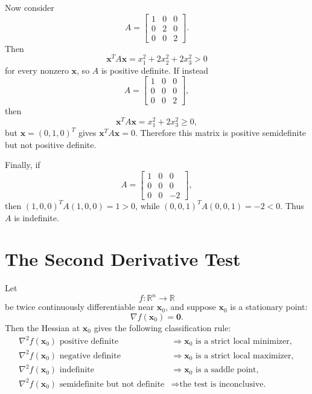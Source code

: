Now consider
\[
    A=\begin{bmatrix}
        1&0&0\\
        0&2&0\\
        0&0&2
    \end{bmatrix}.
\]
Then
\[
    \mathbf{x}^TA\mathbf{x}=x_1^2+2x_2^2+2x_3^2>0
\]
for every nonzero \(\mathbf{x}\), so \(A\) is positive definite. If instead
\[
    A=\begin{bmatrix}
        1&0&0\\
        0&0&0\\
        0&0&2
    \end{bmatrix},
\]
then
\[
    \mathbf{x}^TA\mathbf{x}=x_1^2+2x_3^2\ge 0,
\]
but \(\mathbf{x}=(0,1,0)^T\) gives \(\mathbf{x}^TA\mathbf{x}=0\). Therefore this matrix is positive semidefinite but not positive definite.

Finally, if
\[
    A=\begin{bmatrix}
        1&0&0\\
        0&0&0\\
        0&0&-2
    \end{bmatrix},
\]
then \((1,0,0)^TA(1,0,0)=1>0\), while \((0,0,1)^TA(0,0,1)=-2<0\). Thus \(A\) is indefinite.

\section{The Second Derivative Test}
\label{mf:second-order-conditions}

Let
\[
    f:\mathbb{R}^n\to\mathbb{R}
\]
be twice continuously differentiable near \(\mathbf{x}_0\), and suppose \(\mathbf{x}_0\) is a stationary point:
\[
    \nabla f(\mathbf{x}_0)=\mathbf{0}.
\]
Then the Hessian at \(\mathbf{x}_0\) gives the following classification rule:
\[
\begin{array}{ll}
\nabla^2 f(\mathbf{x}_0) \text{ positive definite} & \Longrightarrow \mathbf{x}_0 \text{ is a strict local minimizer},\\[0.4em]
\nabla^2 f(\mathbf{x}_0) \text{ negative definite} & \Longrightarrow \mathbf{x}_0 \text{ is a strict local maximizer},\\[0.4em]
\nabla^2 f(\mathbf{x}_0) \text{ indefinite} & \Longrightarrow \mathbf{x}_0 \text{ is a saddle point},\\[0.4em]
\nabla^2 f(\mathbf{x}_0) \text{ semidefinite but not definite} & \Longrightarrow \text{the test is inconclusive.}
\end{array}
\]

